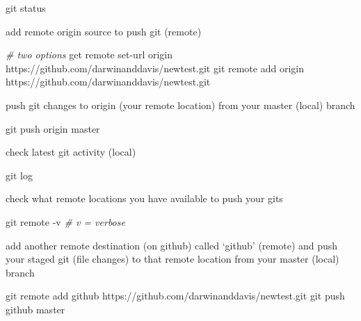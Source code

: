 \documentclass[10,portrait]{article}
\newenvironment{Shaded}{\begin{snugshade}}{\end{snugshade}}
\newcommand{\CommentTok}[1]{\textcolor[rgb]{0.56,0.35,0.01}{\textit{#1}}}
\newcommand{\FunctionTok}[1]{\textcolor[rgb]{0.00,0.00,0.00}{#1}}
\newcommand{\ExtensionTok}[1]{#1}
\newcommand{\NormalTok}[1]{#1}
\begin{document}
\begin{Shaded}
\begin{Highlighting}[]
\FunctionTok{git}\NormalTok{ status }
\end{Highlighting}
\end{Shaded}

add remote origin source to push git (remote)

\begin{Shaded}
\begin{Highlighting}[]
\CommentTok{# two options  }
\ExtensionTok{get}\NormalTok{ remote set-url origin https://github.com/darwinanddavis/newtest.git  }
\FunctionTok{git}\NormalTok{ remote add origin https://github.com/darwinanddavis/newtest.git}
\end{Highlighting}
\end{Shaded}

push git changes to origin (your remote location) from your master
(local) branch

\begin{Shaded}
\begin{Highlighting}[]
\FunctionTok{git}\NormalTok{ push origin master }
\end{Highlighting}
\end{Shaded}

check latest git activity (local)

\begin{Shaded}
\begin{Highlighting}[]
\FunctionTok{git}\NormalTok{ log}
\end{Highlighting}
\end{Shaded}

check what remote locations you have available to push your gits

\begin{Shaded}
\begin{Highlighting}[]
\FunctionTok{git}\NormalTok{ remote -v }\CommentTok{# v = verbose    }
\end{Highlighting}
\end{Shaded}

add another remote destination (on github) called `github' (remote) and
push your staged git (file changes) to that remote location from your
master (local) branch

\begin{Shaded}
\begin{Highlighting}[]
\FunctionTok{git}\NormalTok{ remote add github https://github.com/darwinanddavis/newtest.git }
\FunctionTok{git}\NormalTok{ push github master }
\end{Highlighting}
\end{Shaded}
\end{document}
